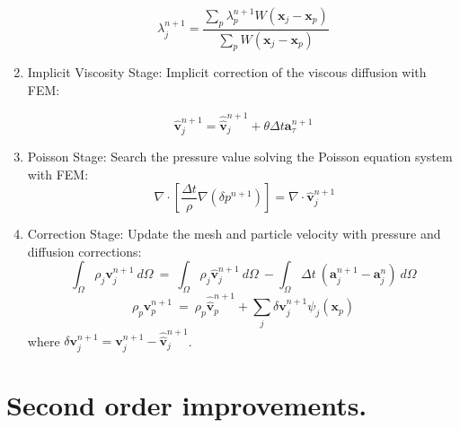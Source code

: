 \documentclass[a4paper,conference]{IEEEtran}
\begin{document}
\begin{enumerate}
\begin{equation}\label{Step3b}
\displaystyle \lambda^{n+1}_{j}=\frac{\sum_{p} \lambda^{n+1}_{p} W(\mathbf{x}_{j}-\mathbf{x}_{p})}{\sum_{p} W(\mathbf{x}_{j}-\mathbf{x}_{p})}
\end{equation}

  \item Implicit Viscosity Stage: Implicit correction of the viscous diffusion with FEM:

 \begin{equation}\label{Step4a}
\displaystyle \widehat{\mathbf{v}}^{n+1}_{j}=\widehat{\widehat{\mathbf{v}}}^{n+1}_{j} + \theta \Delta t \mathbf{a}^{n+1}_{\tau}
\end{equation}

 \item Poisson Stage: Search the pressure value solving the Poisson equation system with FEM:
 \begin{equation}\label{Step5a}
  \ \nabla \cdot [\frac{\Delta t}{\rho}\nabla(\delta p^{n+1})] = \nabla \cdot \widehat{\mathbf{v}}_j^{n+1}
 \end{equation}

 \item Correction Stage: Update the mesh and particle velocity with pressure and diffusion corrections:
 \begin{equation}\label{Step6a}
  \int_{\Omega} \rho_j \mathbf{v}_j^{n+1}\ d\Omega \ = \ \int_{\Omega} \rho_j  \widehat{\mathbf{v}}_j^{n+1}\ d\Omega\ - \int_{\Omega} \Delta t \ (\mathbf{a}_j^{n+1} - \mathbf{a}_j^{n})\ d\Omega
 \end{equation}
  \begin{equation}\label{Step6b}
  \rho_p \mathbf{v}_p^{n+1}\  = \ \rho_p \widehat{\widehat{\mathbf{v}}}_p^{n+1} + \sum_{j} \delta \mathbf{v}_j^{n+1} \psi_j(\mathbf{x}_{p})
  \end{equation}
  where $\delta \mathbf{v}_j^{n+1} = \mathbf{v}_j^{n+1}-\widehat{\widehat{\mathbf{v}}}_j^{n+1}$.

\end{enumerate}

\section{Second order improvements.}
\end{document}
